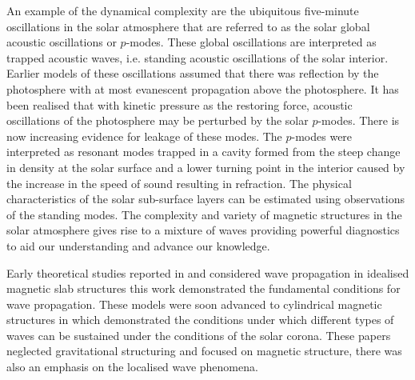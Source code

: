 \documentclass[linenumbers]{aastex63}
\begin{document}
An example of the dynamical complexity are the ubiquitous five-minute oscillations in the solar atmosphere that are referred to as the solar global acoustic oscillations or $p$-modes. These global oscillations are interpreted as trapped acoustic waves, i.e. standing acoustic oscillations of the solar interior. Earlier models of these oscillations assumed that there was reflection by the photosphere with at most evanescent propagation above the photosphere. It has been realised that with kinetic pressure as the restoring force, acoustic oscillations of the photosphere may be perturbed by the solar $p$-modes. There is now increasing evidence for leakage of these modes. The $p$-modes were interpreted as resonant modes trapped in a cavity formed from the steep change in density at the solar surface and a lower turning point in the interior caused by the increase in the speed of sound resulting in refraction. The physical characteristics of the solar sub-surface layers can be estimated using observations of the standing modes. The complexity and variety of magnetic structures in the solar atmosphere gives rise to a mixture of waves providing powerful diagnostics to aid our understanding and advance our knowledge.

Early theoretical studies reported in \citet{Roberts1981a} and \citet{Roberts1981b} considered wave propagation in idealised magnetic slab structures this work demonstrated the fundamental conditions for wave propagation. These models were soon advanced to cylindrical magnetic structures in \citet{EdwinandRoberts1983} which demonstrated the conditions under which different types of waves can be sustained under the conditions of the solar corona. These papers neglected gravitational structuring and focused on magnetic structure, there was also an emphasis on the localised wave phenomena.  
\end{document}
